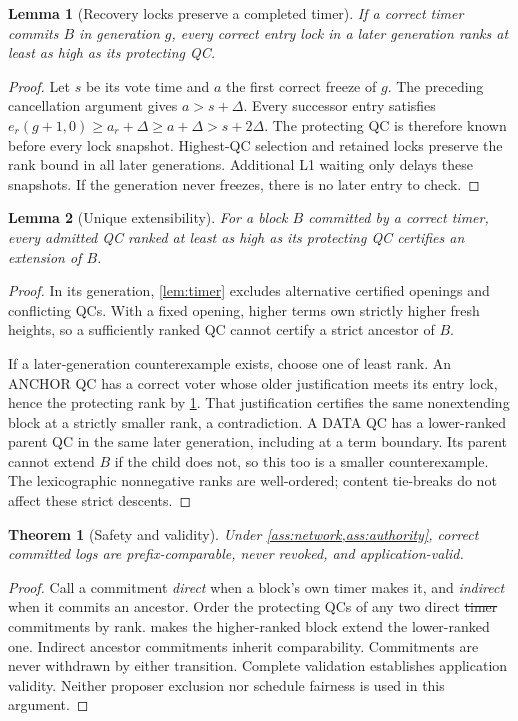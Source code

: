 \documentclass[11pt,a4paper]{article}
\newcommand{\NEW}[1]{{\color{diffNew}#1}}
\newcommand{\DEL}[1]{{\color{diffDel}\sout{#1}}}
\newcommand{\NEW}[1]{#1}
\newcommand{\DEL}[1]{}
\newtheorem{lemma}[lemma]{Lemma}
\newtheorem{theorem}[theorem]{Theorem}
\begin{document}
\begin{lemma}[Recovery locks preserve a completed timer]
\label{lem:lock}
If a correct timer commits $B$ in generation $g$, every correct entry
lock in a later generation ranks at least as high as its \NEW{protecting
QC}.
\end{lemma}
\begin{proof}
Let $s$ be its vote time and $a$ the first correct freeze of $g$.
The preceding cancellation argument gives $a>s+\Delta$. Every successor
entry satisfies
$e_r(g+1,0)\ge a_r+\Delta\ge a+\Delta>s+2\Delta$.
The protecting QC is therefore known before every lock snapshot.
Highest-QC selection and retained locks preserve the rank bound in all
later generations. Additional L1 waiting only delays these snapshots.
If the generation never freezes, there is no later entry to check.
\end{proof}

\begin{lemma}[Unique extensibility]
\label{lem:extension}
For a block $B$ committed by a correct timer, every admitted QC ranked
at least as high as its protecting QC certifies an extension of $B$.
\end{lemma}
\begin{proof}
In its generation, \cref{lem:timer} excludes alternative certified
openings and conflicting QCs. With a fixed opening, higher terms own
strictly higher fresh heights, so a sufficiently ranked QC cannot certify
a strict ancestor of $B$.

If a later-generation counterexample exists, choose one of least rank.
An ANCHOR QC has a correct voter whose older justification meets its
entry lock, hence the protecting rank by \cref{lem:lock}. That justification
certifies the same nonextending block at a strictly smaller rank, a
contradiction. A DATA QC has a lower-ranked parent QC in the same later
generation, including at a term boundary. Its parent cannot extend $B$
if the child does not, so this too is a smaller counterexample. The
lexicographic nonnegative ranks are well-ordered; content tie-breaks do
not affect these strict descents.
\end{proof}

\begin{theorem}[Safety and validity]
\label{thm:safety}
Under \cref{ass:network,ass:authority}, correct committed logs are
prefix-comparable, never revoked, and application-valid.
\end{theorem}
\begin{proof}
\NEW{Call a commitment \emph{direct} when a block's own timer makes it, and
\emph{indirect} when it commits an ancestor.} Order the protecting QCs of
any two direct \DEL{timer} commitments by rank.
 makes the higher-ranked block extend the lower-ranked
one. Indirect ancestor commitments inherit comparability. Commitments
are never withdrawn by either transition. Complete validation establishes
application validity. Neither proposer exclusion nor schedule fairness
is used in this argument.
\end{proof}
\end{document}
